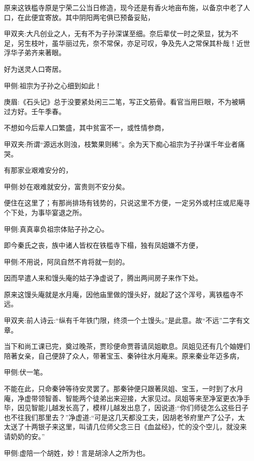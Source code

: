 \begin{parag}
    原来这铁槛寺原是宁荣二公当日修造，现今还是有香火地亩布施，以备京中老了人口，在此便宜寄放。其中阴阳两宅俱已预备妥贴，\begin{note}甲双夹:大凡创业之人，无有不为子孙深谋至细。奈后辈仗一时之荣显，犹为不足，另生枝叶，虽华丽过先，奈不常保，亦足可叹，争及先人之常保其朴哉！近世浮华子弟齐来著眼。\end{note}好为送灵人口寄居。\begin{note}甲侧:祖宗为子孙之心细到如此！\end{note}\begin{note}庚眉:《石头记》总于没要紧处闲三二笔，写正文筋骨。看官当用巨眼，不为被瞒过方好。壬午季春。\end{note}不想如今后辈人口繁盛，其中贫富不一，或性情参商，\begin{note}甲双夹:所谓“源远水则浊，枝繁果则稀”。余为天下痴心祖宗为子孙谋千年业者痛哭。\end{note}有那家业艰难安分的，\begin{note}甲侧:妙在艰难就安分，富贵则不安分矣。\end{note}便住在这里了；有那尚排场有钱势的，只说这里不方便，一定另外或村庄或尼庵寻个下处，为事毕宴退之所。\begin{note}甲侧:真真辜负祖宗体贴子孙之心。\end{note}即今秦氏之丧，族中诸人皆权在铁槛寺下榻，独有凤姐嫌不方便，\begin{note}甲侧:不用说，阿凤自然不肯将就一刻的。\end{note}因而早遣人来和馒头庵的姑子净虚说了，腾出两间房子来作下处。
\end{parag}


\begin{parag}
    原来这馒头庵就是水月庵，因他庙里做的馒头好，就起了这个浑号，离铁槛寺不远。\begin{note}甲双夹:前人诗云:“纵有千年铁门限，终须一个土馒头。”是此意。故“不远”二字有文章。\end{note}当下和尚工课已完，奠过晚茶，贾珍便命贾蓉请凤姐歇息。凤姐见还有几个妯娌们陪著女亲，自己便辞了众人，带著宝玉、秦钟往水月庵来。原来秦业年迈多病，\begin{note}甲侧:伏一笔。\end{note}不能在此，只命秦钟等待安灵罢了。那秦钟便只跟著凤姐、宝玉，一时到了水月庵，净虚带领智善、智能两个徒弟出来迎接，大家见过。凤姐等来至净室更衣净手毕，因见智能儿越发长高了，模样儿越发出息了，因说道:“你们师徒怎么这些日子也不往我们那里去？”净虚道:“可是这几天都没工夫，因胡老爷府里产了公子，太太送了十两银子来这里，叫请几位师父念三日《血盆经》，忙的没个空儿，就没来请奶奶的安。”\begin{note}甲侧:虚陪一个胡姓，妙！言是胡涂人之所为也。\end{note}
\end{parag}


